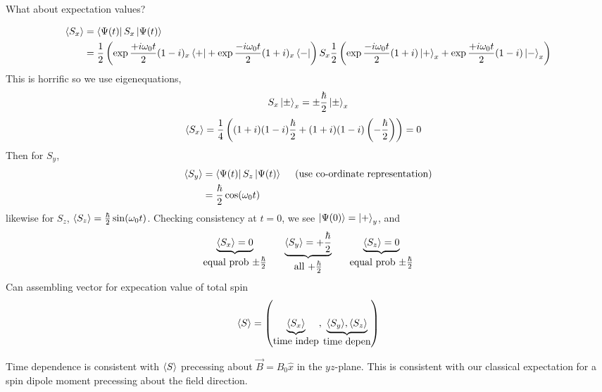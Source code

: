 \documentclass[english, 11pt]{article}
\begin{document}
    What about expectation values?

    \begin{align*}
      \langle S_x \rangle & = \left\langle\Psi(t)\right|S_x\left|\Psi(t)\right\rangle \\
              & = \frac{1}{2} \left( \exp{\frac{+i\omega_0t}{2}} (1-i){}_x\left\langle+\right| + \exp{\frac{-i\omega_0t}{2}}(1+i){}_x\left\langle-\right| \right) S_x \frac{1}{2} \left( \exp{\frac{-i\omega_0t}{2}} (1+i)\left|+\right\rangle_x + \exp{\frac{+i\omega_0t}{2}}(1-i)\left|-\right\rangle_x \right)
    \end{align*}
    This is horrific so we use eigenequations,
    \[ S_x\left|\pm\right\rangle_x = \pm\frac{\hbar}{2}\left|\pm\right\rangle_x \]
    \begin{align*}
      \langle S_x \rangle & = \frac{1}{4} \left( (1+i)(1-i)\frac{\hbar}{2} + (1+i)(1-i)\left( -\frac{\hbar}{2} \right) \right) = 0
    \end{align*}
    Then for $S_y$,
    \begin{align*}
      \langle S_y \rangle & = \left\langle\Psi(t)\right|S_z\left|\Psi(t)\right\rangle \ \ \ \ \mbox{(use co-ordinate representation)} \\
              & = \frac{\hbar}{2}\cos(\omega_0t)
    \end{align*}
    likewise for $S_z$, $\langle S_z \rangle = \frac{\hbar}{2}\sin(\omega_0t)$. Checking consistency at $t = 0$, we see $\left|\Psi(0)\right\rangle = \left|+\right\rangle_y$, and
    \[ \underbrace{\E{S_x} = 0}_{\mbox{equal prob $\pm\f{\hbar}{2}$}} \ \ \ \ \ \underbrace{\E{S_y} = +\f{\hbar}{2}}_{\mbox{all $+\f{\hbar}{2}$}} \ \ \ \ \ \underbrace{\E{S_z} = 0}_{\mbox{equal prob $\pm\f{\hbar}{2}$}}\]
    Can assembling vector for expecation value of total spin
    \[ \langle S \rangle = \left( \underbrace{\langle S_x \rangle}_{\mbox{time indep}}, \underbrace{\langle S_y \rangle, \langle S_z \rangle}_{\mbox{time depen}} \right) \]

    Time dependence is consistent with $\langle S \rangle$ precessing about $\vec{B} = B_0\hat{x}$ in the $yz$-plane. This is consistent with our classical expectation for a spin dipole moment precessing about the field direction.



























\end{document}
